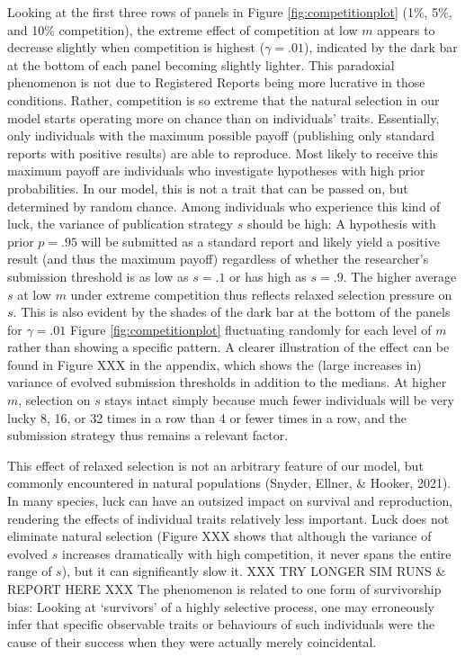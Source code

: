 \documentclass[
  ,man,mask,floatsintext]{apa6}
\begin{document}
Looking at the first three rows of panels in Figure \ref{fig:competitionplot} (1\%, 5\%, and 10\% competition), the extreme effect of competition at low \(m\) appears to decrease slightly when competition is highest (\(\gamma = .01\)), indicated by the dark bar at the bottom of each panel becoming slightly lighter.
This paradoxial phenomenon is not due to Registered Reports being more lucrative in those conditions.
Rather, competition is so extreme that the natural selection in our model starts operating more on chance than on individuals' traits.
Essentially, only individuals with the maximum possible payoff (publishing only standard reports with positive results) are able to reproduce.
Most likely to receive this maximum payoff are individuals who investigate hypotheses with high prior probabilities.
In our model, this is not a trait that can be passed on, but determined by random chance.
Among individuals who experience this kind of luck, the variance of publication strategy \(s\) should be high:
A hypothesis with prior \(p = .95\) will be submitted as a standard report and likely yield a positive result (and thus the maximum payoff) regardless of whether the researcher's submission threshold is as low as \(s = .1\) or has high as \(s = .9\).
The higher average \(s\) at low \(m\) under extreme competition thus reflects relaxed selection pressure on \(s\).
This is also evident by the shades of the dark bar at the bottom of the panels for \(\gamma = .01\) Figure \ref{fig:competitionplot} fluctuating randomly for each level of \(m\) rather than showing a specific pattern.
A clearer illustration of the effect can be found in Figure XXX in the appendix, which shows the (large increases in) variance of evolved submission thresholds in addition to the medians.
At higher \(m\), selection on \(s\) stays intact simply because much fewer individuals will be very lucky 8, 16, or 32 times in a row than 4 or fewer times in a row, and the submission strategy thus remains a relevant factor.

This effect of relaxed selection is not an arbitrary feature of our model, but commonly encountered in natural populations (Snyder, Ellner, \& Hooker, 2021).
In many species, luck can have an outsized impact on survival and reproduction, rendering the effects of individual traits relatively less important.
Luck does not eliminate natural selection (Figure XXX shows that although the variance of evolved \(s\) increases dramatically with high competition, it never spans the entire range of \(s\)), but it can significantly slow it.
XXX TRY LONGER SIM RUNS \& REPORT HERE XXX
The phenomenon is related to one form of survivorship bias:
Looking at `survivors' of a highly selective process, one may erroneously infer that specific observable traits or behaviours of such individuals were the cause of their success when they were actually merely coincidental.
\end{document}

